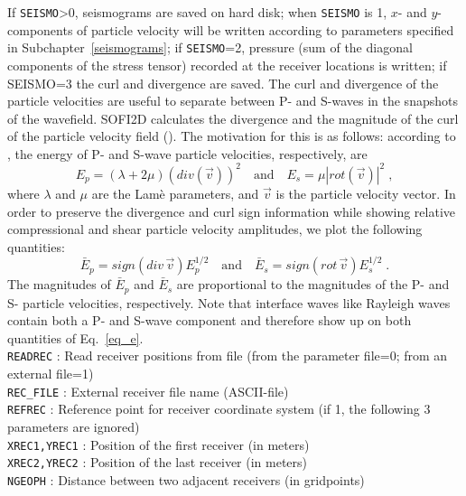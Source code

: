 If \texttt{SEISMO}>0, seismograms are saved on hard disk; when \texttt{SEISMO} is 1, $x$- and $y$-components of particle velocity will be written according to parameters specified in Subchapter~\ref{seismograms}; if \texttt{SEISMO}=2, pressure (sum of the diagonal components of the stress tensor) recorded at the receiver locations is written; if SEISMO=3 the curl and divergence are saved. The curl and divergence of the particle velocities are useful to separate between P- and S-waves in the snapshots of the wavefield. SOFI2D calculates the divergence and the magnitude of the curl of the particle velocity field (\cite{dougherty:88}). The motivation for this is as follows: according to \citet{morse:53}, the energy of P- and S-wave particle velocities, respectively, are
\begin{equation}
    E_p=\left(\lambda + 2 \mu\right) (div(\vec{v}))^2 \quad \mbox{and} \quad E_s=\mu \left|rot(\vec{v})\right|^2\;,
    \label{eq_E}
\end{equation}
where $\lambda$ and $\mu$ are the Lam\`{e} parameters, and $\vec{v}$ is the particle velocity vector. In order to preserve the divergence and curl sign information  while showing relative compressional and shear particle velocity amplitudes, we plot the following quantities:
\begin{equation}
    \bar{E}_p = sign(div\,\vec{v}) E_p^{1/2} \quad \mbox{and} \quad \bar{E}_s= sign(rot\,\vec{v}) E_s^{1/2}\;.
    \label{eq_e}
\end{equation}
The magnitudes of $\bar{E}_p$ and $\bar{E}_s$ are proportional to the magnitudes of the P- and S- particle velocities, respectively. Note that interface waves like Rayleigh waves contain both a P- and S-wave component and therefore show up on both quantities of Eq.~\ref{eq_e}.\\

\texttt{READREC} : Read receiver positions from file (from the parameter file=0; from an external file=1)\\
\texttt{REC\_FILE} : External receiver file name (ASCII-file)\\
\texttt{REFREC} : Reference point for receiver coordinate system (if 1, the following 3 parameters are ignored)\\
\texttt{XREC1,YREC1} : Position of the first receiver (in meters) \\
\texttt{XREC2,YREC2} : Position of the last receiver (in meters)\\
\texttt{NGEOPH} : Distance between two adjacent receivers (in gridpoints)

